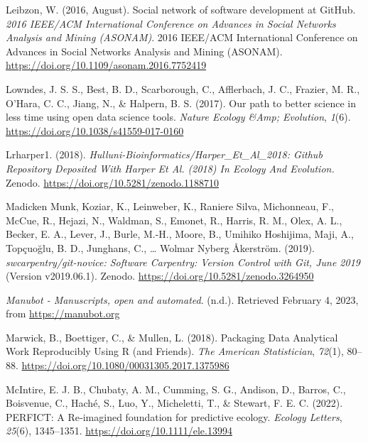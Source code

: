 \begin{CSLReferences}{1}{0}
\leavevmode{}%
Leibzon, W. (2016, August). Social network of software development at GitHub. \emph{2016 IEEE/ACM International Conference on Advances in Social Networks Analysis and Mining (ASONAM)}. 2016 IEEE/ACM International Conference on Advances in Social Networks Analysis and Mining (ASONAM). \url{https://doi.org/10.1109/asonam.2016.7752419}

\leavevmode{}%
Lowndes, J. S. S., Best, B. D., Scarborough, C., Afflerbach, J. C., Frazier, M. R., O'Hara, C. C., Jiang, N., \& Halpern, B. S. (2017). Our path to better science in less time using open data science tools. \emph{Nature Ecology \&Amp; Evolution}, \emph{1}(6). \url{https://doi.org/10.1038/s41559-017-0160}

\leavevmode{}%
Lrharper1. (2018). \emph{Hulluni-Bioinformatics/Harper\_Et\_Al\_2018: Github Repository Deposited With Harper Et Al. (2018) In Ecology And Evolution.} Zenodo. \url{https://doi.org/10.5281/zenodo.1188710}

\leavevmode{}%
Madicken Munk, Koziar, K., Leinweber, K., Raniere Silva, Michonneau, F., McCue, R., Hejazi, N., Waldman, S., Emonet, R., Harris, R. M., Olex, A. L., Becker, E. A., Lever, J., Burle, M.-H., Moore, B., Umihiko Hoshijima, Maji, A., Topçuoğlu, B. D., Junghans, C., \ldots{} Wolmar Nyberg Åkerström. (2019). \emph{swcarpentry/git-novice: Software Carpentry: Version Control with Git, June 2019} (Version v2019.06.1). Zenodo. \url{https://doi.org/10.5281/zenodo.3264950}

\leavevmode{}%
\emph{Manubot - Manuscripts, open and automated}. (n.d.). Retrieved February 4, 2023, from \url{https://manubot.org}

\leavevmode{}%
Marwick, B., Boettiger, C., \& Mullen, L. (2018). Packaging Data Analytical Work Reproducibly Using R (and Friends). \emph{The American Statistician}, \emph{72}(1), 80--88. \url{https://doi.org/10.1080/00031305.2017.1375986}

\leavevmode{}%
McIntire, E. J. B., Chubaty, A. M., Cumming, S. G., Andison, D., Barros, C., Boisvenue, C., Haché, S., Luo, Y., Micheletti, T., \& Stewart, F. E. C. (2022). PERFICT: A Re‐imagined foundation for predictive ecology. \emph{Ecology Letters}, \emph{25}(6), 1345--1351. \url{https://doi.org/10.1111/ele.13994}


\end{CSLReferences}
